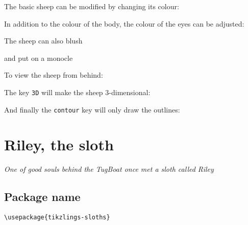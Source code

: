 \documentclass[parskip=half]{scrartcl}
\begin{document}
The basic sheep can be modified by changing its colour:
\begin{tcblisting}{}
\sheep[body=blue]
\end{tcblisting}

In addition to the colour of the body, the colour of the eyes can be adjusted:
\begin{tcblisting}{}
\sheep[eye=red]
\end{tcblisting}

The sheep can also blush
\begin{tcblisting}{}
\sheep[blush]
\end{tcblisting}

and put on a monocle
\begin{tcblisting}{}
\sheep[monocle]
\end{tcblisting}

To view the sheep from behind:
\begin{tcblisting}{}
\sheep[back]
\end{tcblisting}

The key \lstinline|3D| will make the sheep 3-dimensional:
\begin{tcblisting}{}
\sheep[3D]
\end{tcblisting}

And finally the \lstinline|contour| key will only draw the outlines:
\begin{tcblisting}{}
\sheep[contour=black]
\end{tcblisting}

%
%
\clearpage
\section[Sloth]{Riley, the sloth}

\emph{One of good souls behind the TugBoat once met a sloth called Riley}

\subsection{Package name}

\begin{tcolorbox}[lower separated=false, lefthand width=.8\linewidth]
\vspace*{0.5cm}
\lstinline|\usepackage{tikzlings-sloths}| 
\vspace*{0.5cm}
\end{tcolorbox}
\end{document}
